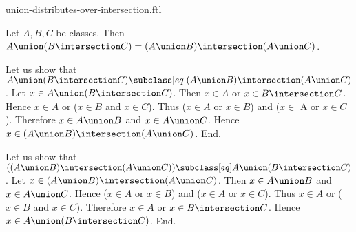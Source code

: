 \documentclass{article}
\begin{document}
\begin{smodule}[creators={Marcel Schütz}]{union-distributes-over-intersection.ftl}

  \begin{fproposition*}[label=5609225394847744]
    Let $A, B, C$ be classes.
    Then $A \union (B \intersection C) = (A \union B) \intersection (A \union C)$.
  \end{fproposition*}
  \begin{fproof}
    Let us show that $A \union (B \intersection C) \subclass[eq] (A \union B) \intersection (A \union C)$.
      Let $x \in A \union (B \intersection C)$.
      Then $x \in A$ or $x \in B \intersection C$.
      Hence $x \in A$ or ($x \in B$ and $x \in C$).
      Thus ($x \in A$ or $x \in B$) and ($x \in$ A or $x \in C$).
      Therefore $x \in A \union B$ and $x \in A \union C$.
      Hence $x \in (A \union B) \intersection (A \union C)$.
    End.

    Let us show that $((A \union B) \intersection (A \union C)) \subclass[eq] A \union (B \intersection C)$. %
      Let $x \in (A \union B) \intersection (A \union C)$.
      Then $x \in A \union B$ and $x \in A \union C$.
      Hence ($x \in A$ or $x \in B$) and ($x \in A$ or $x \in C$).
      Thus $x \in A$ or ($x \in B$ and $x \in C$).
      Therefore $x \in A$ or $x \in B \intersection C$.
      Hence $x \in A \union (B \intersection C)$.
    End.
  \end{fproof}
\end{smodule}
\end{document}
